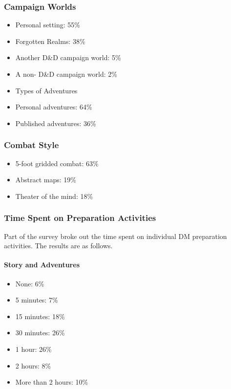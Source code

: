 \documentclass[10pt,a4paper,twoside,bg=print,twocolumn,openany,nodeprecatedcode]{dndbook}
\begin{document}
\subsubsection{Campaign Worlds}

\begin{itemize}
\item Personal setting: 55\%
\item Forgotten Realms: 38\%
\item Another D\&D campaign world: 5\%
\item A non- D\&D campaign world: 2\%
\item Types of Adventures
\item Personal adventures: 64\%
\item Published adventures: 36\%
\end{itemize}

\subsubsection{Combat Style}

\begin{itemize}
\item 5-foot gridded combat: 63\%
\item Abstract maps: 19\%
\item Theater of the mind: 18\%
\end{itemize}

\subsubsection{Time Spent on Preparation Activities}
Part of the survey broke out the time spent on individual DM preparation activities. The results are as follows.
\paragraph{Story and Adventures}

\begin{itemize}
\item None: 6\%
\item 5 minutes: 7\%
\item 15 minutes: 18\%
\item 30 minutes: 26\%
\item 1 hour: 26\%
\item 2 hours: 8\%
\item More than 2 hours: 10\%
\end{itemize}
\end{document}
